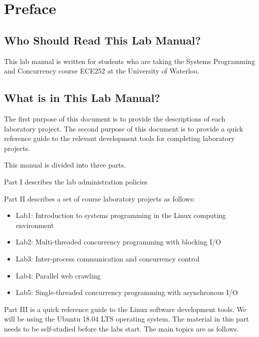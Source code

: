 \frontmatter 



\chapter{Preface}

\section*{Who Should Read This Lab Manual?}
This lab manual is written for students who are taking the Systems Programming and Concurrency course ECE252 at the University of Waterloo.

\section*{What is in This Lab Manual?}

The first purpose of this document is to provide the descriptions of each laboratory project.
The second purpose of this document is to provide a quick reference guide to the relevant development tools 
for completing laboratory projects.

This manual is divided into three parts. 

Part I describes the lab administration policies 

Part II describes a set of course laboratory projects as follows:

\begin{itemize}
    \item Lab1: Introduction to systems programming in the Linux computing environment
    \item Lab2: Multi-threaded concurrency programming with blocking I/O
    \item Lab3: Inter-process communication and concurrency control
    \item Lab4: Parallel web crawling
    \item Lab5: Single-threaded concurrency programming with asynchronous I/O  
\end{itemize}

Part III is a quick reference guide to the Linux software development tools. We will be using the Ubuntu 18.04 LTS operating system. The material in this part needs to be self-studied before the labs start.
The main topics are as follows.

